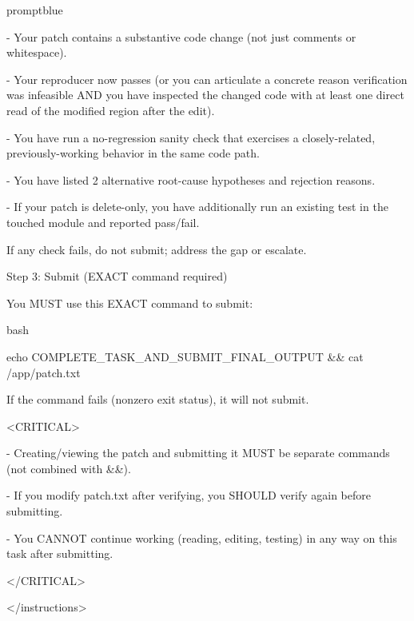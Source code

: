 \begin{promptbox}{promptblue}
{- Your patch contains a substantive code change (not just comments or whitespace).\par
- Your reproducer now passes (or you can articulate a concrete reason verification was infeasible AND you have inspected the changed code with at least one direct read of the modified region after the edit).\par
- You have run a no-regression sanity check that exercises a closely-related, previously-working behavior in the same code path.\par
- You have listed 2 alternative root-cause hypotheses and rejection reasons.\par
- If your patch is delete-only, you have additionally run an existing test in the touched module and reported pass/fail.\par
\vspace{0.35em}\par
If any check fails, do not submit; address the gap or escalate.\par
\vspace{0.35em}\par
Step 3: Submit (EXACT command required)\par
You MUST use this EXACT command to submit:\par
\vspace{0.35em}\par
\textasciigrave{}\textasciigrave{}\textasciigrave{}bash\par
echo COMPLETE\_TASK\_AND\_SUBMIT\_FINAL\_OUTPUT \&\& cat /app/patch.txt\par
\textasciigrave{}\textasciigrave{}\textasciigrave{}\par
\vspace{0.35em}\par
If the command fails (nonzero exit status), it will not submit.\par
\vspace{0.35em}\par
\textless{}CRITICAL\textgreater{}\par
- Creating/viewing the patch and submitting it MUST be separate commands (not combined with \&\&).\par
- If you modify patch.txt after verifying, you SHOULD verify again before submitting.\par
- You CANNOT continue working (reading, editing, testing) in any way on this task after submitting.\par
\textless{}/CRITICAL\textgreater{}\par
\textless{}/instructions\textgreater{}\par
}
\end{promptbox}

